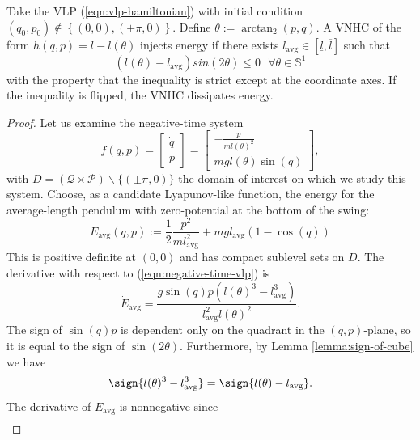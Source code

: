 \begin{thm}\label{thm:vlp-energy-stabilization}
   Take the VLP (\ref{eqn:vlp-hamiltonian}) with initial condition 
   \((q_0,p_0) \not \in \left\{(0,0),(\pm\pi,0)\right\}\).
   Define \(\theta := \arctan_2(p,q)\). 
   A VNHC of the form \(h(q,p) = l - l(\theta)\) injects energy if there exists 
   \(l_\text{avg} \in [\underline{l},\overline{l}]\) such that 
   \begin{equation}\label{eqn:vlp-energy-gain-condition}
      \left(l(\theta) - l_\text{avg}\right)sin(2\theta) \leq 0 \text{ }\forall \theta \in \mathbb{S}^1
   \end{equation}
   with the property that the inequality is strict except at the
   coordinate axes.
   If the inequality is flipped, the VNHC dissipates energy. 
\end{thm}
\begin{proof}
   Let us examine the negative-time system
   \begin{equation}\label{eqn:negative-time-vlp}
      f(q,p) = 
      \begin{bmatrix}
         \dot{q} \\ \dot{p}
      \end{bmatrix} = \begin{bmatrix}
         -\frac{p}{ml(\theta)^2} \\
         mgl(\theta)\sin(q)
      \end{bmatrix}
      ,
   \end{equation}
   with \(D = (\mathcal{Q}\times \mathcal{P}) \backslash \{(\pm \pi, 0)\}\)
   the domain of interest on which we study this system.
   Choose, as a candidate Lyapunov-like function, the energy for the
   average-length pendulum with zero-potential at the bottom of the swing:
   \[
       E_\text{avg}(q,p) := \frac{1}{2}\frac{p^2}{m l_\text{avg}^2} 
           + m g l_\text{avg} (1-\cos(q))
   \]
   This is positive definite at \((0,0)\) and has compact sublevel
   sets on \(D\). The derivative with respect to (\ref{eqn:negative-time-vlp})
   is
   \[
      \dot{E}_\text{avg} = \frac{g\sin(q)p \left(l(\theta)^3 - l_\text{avg}^3\right)}
              {l_\text{avg}^2l(\theta)^2}
      .
   \]
   The sign of \(\sin(q)p\) is dependent only on the quadrant in the
   \((q,p)\)-plane, so it is equal to the sign of \(\sin(2\theta)\). 
   Furthermore, by Lemma \ref{lemma:sign-of-cube} we have
   \[ 
       \sign{l(\theta)^3 - l_\text{avg}^3} = \sign{ l(\theta) - l_\text{avg}}
       .
   \]
   The derivative of \(E_\text{avg}\) is nonnegative since
   \begin{align*}

\end{align*}
\end{proof}
